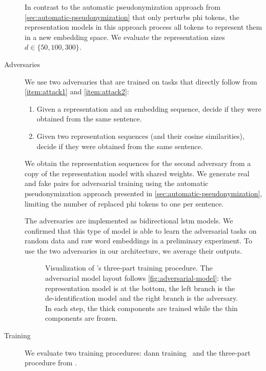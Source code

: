 \begin{description}
    In contrast to the automatic pseudonymization approach from \cref{sec:automatic-pseudonymization} that only perturbs \ac{phi} tokens, the representation models in this approach process all tokens to represent them in a new embedding space.
    We evaluate the representation sizes $d \in \{50, 100, 300\}$. 
    
    \item[Adversaries]
    We use two adversaries that are trained on tasks that directly follow from \ref{item:attack1} and \ref{item:attack2}:
    \begin{enumerate}[label=T\arabic*.,ref=T\arabic*]
        \item Given a representation and an embedding sequence, decide if they were obtained from the same sentence.
        \item Given two representation sequences (and their cosine similarities), decide if they were obtained from the same sentence.
    \end{enumerate}

    We obtain the representation sequences for the second adversary from a copy of the representation model with shared weights.
    We generate real and fake pairs for adversarial training using the automatic pseudonymization approach presented in \cref{sec:automatic-pseudonymization}, limiting the number of replaced \ac{phi} tokens to one per sentence.
    
    The adversaries are implemented as bidirectional \ac{lstm} models.
    We confirmed that this type of model is able to learn the adversarial tasks on random data and raw word embeddings in a preliminary experiment.
    To use the two adversaries in our architecture, we average their outputs.
    
     \begin{figure}
        \centering
        
        \caption[Adversarial training procedure]{%
            Visualization of \citeauthor{feutry2018learning}'s three-part training procedure.
            The adversarial model layout follows \cref{fig:adversarial-model}: the representation model is at the bottom, the left branch is the de-identification model and the right branch is the adversary.
            In each step, the thick components are trained while the thin components are frozen.
        }\label{fig:feutry-training}
    \end{figure}
    
    \item[Training]
    We evaluate two training procedures: \ac{dann} training~\citep{ganin2016domain} and the three-part procedure from \citet{feutry2018learning}.
    

\end{description}
